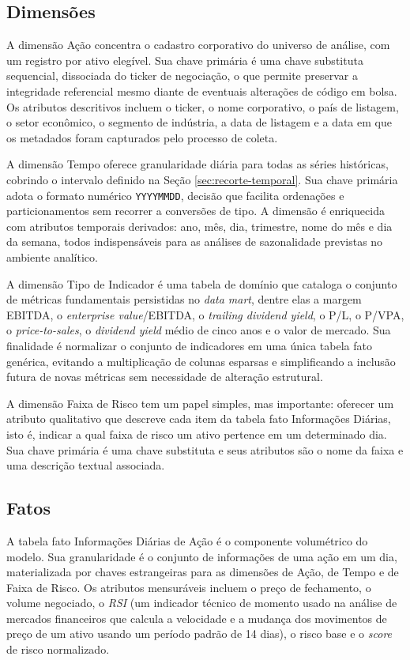 \subsection{Dimensões}

A dimensão Ação concentra o cadastro corporativo do universo de análise, com um registro por ativo elegível. Sua chave primária é uma chave substituta sequencial, dissociada do ticker de negociação, o que permite preservar a integridade referencial mesmo diante de eventuais alterações de código em bolsa. Os atributos descritivos incluem o ticker, o nome corporativo, o país de listagem, o setor econômico, o segmento de indústria, a data de listagem e a data em que os metadados foram capturados pelo processo de coleta.

A dimensão Tempo oferece granularidade diária para todas as séries históricas, cobrindo o intervalo definido na Seção \ref{sec:recorte-temporal}. Sua chave primária adota o formato numérico \texttt{YYYYMMDD}, decisão que facilita ordenações e particionamentos sem recorrer a conversões de tipo. A dimensão é enriquecida com atributos temporais derivados: ano, mês, dia, trimestre, nome do mês e dia da semana, todos indispensáveis para as análises de sazonalidade previstas no ambiente analítico.

A dimensão Tipo de Indicador é uma tabela de domínio que cataloga o conjunto de métricas fundamentais persistidas no \textit{data mart}, dentre elas a margem EBITDA, o \textit{enterprise value}/EBITDA, o \textit{trailing dividend yield}, o P/L, o P/VPA, o \textit{price-to-sales}, o \textit{dividend yield} médio de cinco anos e o valor de mercado. Sua finalidade é normalizar o conjunto de indicadores em uma única tabela fato genérica, evitando a multiplicação de colunas esparsas e simplificando a inclusão futura de novas métricas sem necessidade de alteração estrutural.

A dimensão Faixa de Risco tem um papel simples, mas importante: oferecer um atributo qualitativo que descreve cada item da tabela fato Informações Diárias, isto é, indicar a qual faixa de risco um ativo pertence em um determinado dia. Sua chave primária é uma chave substituta e seus atributos são o nome da faixa e uma descrição textual associada.

\subsection{Fatos}

A tabela fato Informações Diárias de Ação é o componente volumétrico do modelo. Sua granularidade é o conjunto de informações de uma ação em um dia, materializada por chaves estrangeiras para as dimensões de Ação, de Tempo e de Faixa de Risco. Os atributos mensuráveis incluem o preço de fechamento, o volume negociado, o \textit{RSI} (um indicador técnico de momento usado na análise de mercados financeiros que calcula a velocidade e a mudança dos movimentos de preço de um ativo usando um período padrão de 14 dias), o risco base e o \textit{score} de risco normalizado.


